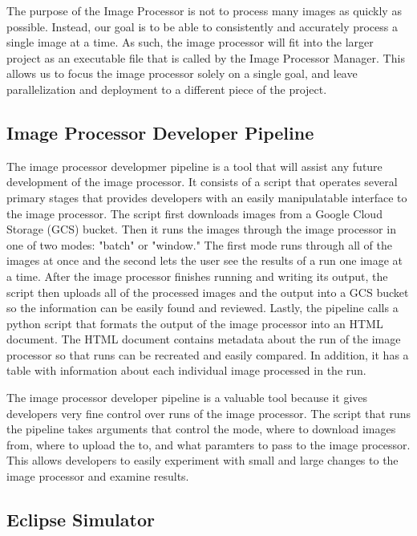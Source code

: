 \documentclass[10pt, onecolumn, draftclsnofoot, letterpaper, compsoc]{IEEEtran}
\begin{document}
The purpose of the Image Processor is not to process many images as quickly as
possible. Instead, our goal is to be able to consistently and accurately process
a single image at a time. As such, the image processor will fit into the larger
project as an executable file that is called by the Image Processor Manager.
This allows us to focus the image processor solely on a single goal, and leave
parallelization and deployment to a different piece of the project. \\

\subsection{Image Processor Developer Pipeline}

The image processor developmer pipeline is a tool that will assist any future
development of the image processor. It consists of a script that operates
several primary stages that provides developers with an easily manipulatable
interface to the image processor. The script first downloads images from a
Google Cloud Storage (GCS) bucket. Then it runs the images through the image
processor in one of two modes: "batch" or "window." The first mode runs through
all of the images at once and the second lets the user see the results of a run
one image at a time. After the image processor finishes running and writing its
output, the script then uploads all of the processed images and the output into
a GCS bucket so the information can be easily found and reviewed. Lastly, the
pipeline calls a python script that formats the output of the image processor
into an HTML document. The HTML document contains metadata about the run of the
image processor so that runs can be recreated and easily compared. In addition,
it has a table with information about each individual image processed in the run.

The image processor developer pipeline is a valuable tool because it gives
developers very fine control over runs of the image processor. The script that
runs the pipeline takes arguments that control the mode, where to download
images from, where to upload the to, and what paramters to pass to the image
processor. This allows developers to easily experiment with small and large
changes to the image processor and examine results. \\

\subsection{Eclipse Simulator}
\end{document}
